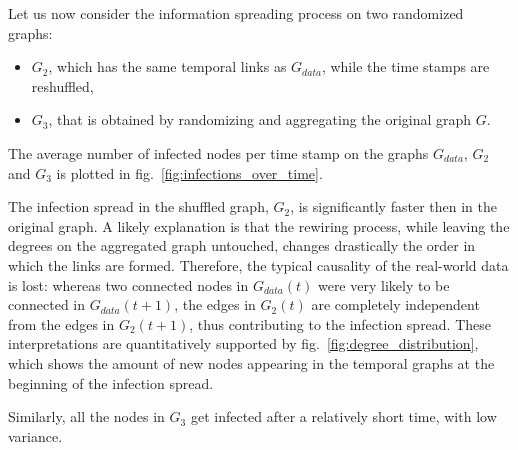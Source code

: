 \documentclass[letterpaper]{article}
\begin{document}
\noindent Let us now consider the information spreading process on two randomized graphs:
\begin{itemize}
\item \(G_2\), which has the same temporal links as \(G_{data}\), while the time stamps are reshuffled,
\item \(G_3\), that is obtained by randomizing and aggregating the original graph \(G\).
\end{itemize}

\noindent The average number of infected nodes per time stamp on the graphs \(G_{data}\), \(G_2\) and \(G_3\) is plotted in fig.~\ref{fig:infections_over_time}. 

\noindent The infection spread in the shuffled graph, \(G_2\), is significantly faster then in the original graph. A likely explanation is that the rewiring process, while leaving the degrees on the aggregated graph untouched, changes drastically the order in which the links are formed. Therefore, the typical causality of the real-world data is lost: whereas two connected nodes in \(G_{data}(t)\) were very likely to be connected in \(G_{data}(t+1)\), the edges in \(G_2(t)\) are completely independent from the edges in \(G_2(t+1)\), thus contributing to the infection spread.
These interpretations are quantitatively supported by fig.~\ref{fig:degree_distribution}, which shows the amount of new nodes appearing in the temporal graphs at the beginning of the infection spread. 

Similarly, all the nodes in \(G_3\) get infected after a relatively short time, with low variance.
\end{document}

